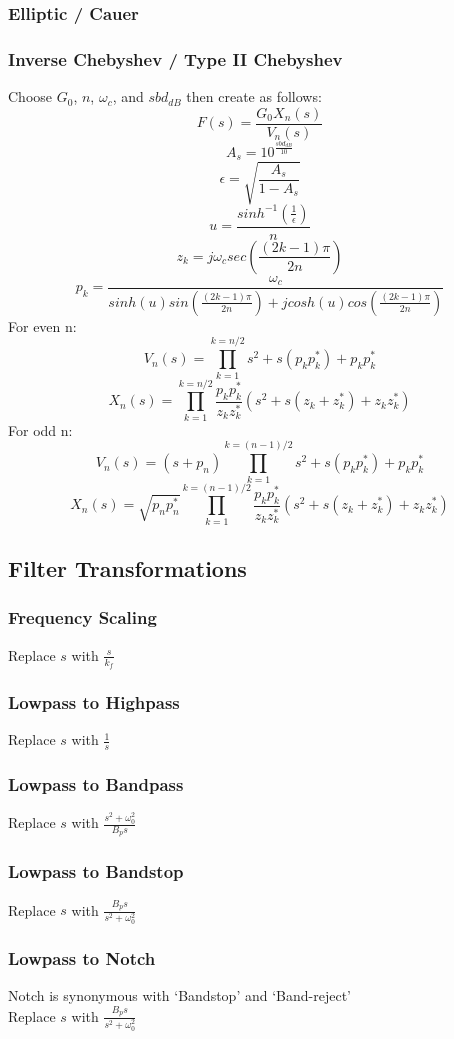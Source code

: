 \documentclass[11pt, oneside]{article}
\begin{document}
\subsubsection{Elliptic / Cauer}
\subsubsection{Inverse Chebyshev / Type II Chebyshev}
Choose $G_0$, $n$, $\omega_c$, and $sbd_{dB}$ then create as follows:\\
\[F(s) = \frac{G_0X_n(s)}{V_n(s)}\]
\[A_s = 10^{\frac{sbd_{dB}}{10}}\]
\[\epsilon = \sqrt{\frac{A_s}{1-A_s}}\]
\[u = \frac{sinh^{-1}(\frac{1}{\epsilon})}{n}\]
\[z_k = j\omega_c sec(\frac{(2k-1)\pi}{2n})\]
\[p_k = \frac{\omega_c}{sinh(u)sin(\frac{(2k-1)\pi}{2n})+jcosh(u)cos(\frac{(2k-1)\pi}{2n})}\]
For even n:
\[V_n(s) = \prod_{k=1}^{k=n/2}s^2+s(p_kp_k^*)+p_kp_k^*\]
\[X_n(s) = \prod_{k = 1}^{k = n/2}\frac{p_kp_k^*}{z_kz_k^*}(s^2+s(z_k+z_k^*)+z_kz_k^*)\]
For odd n:
\[V_n(s) = (s+p_n)\prod_{k=1}^{k=(n-1)/2}s^2+s(p_kp_k^*)+p_kp_k^*\]
\[X_n(s) =\sqrt{p_np_n^*} \prod_{k = 1}^{k = (n-1)/2}\frac{p_kp_k^*}{z_kz_k^*}(s^2+s(z_k+z_k^*)+z_kz_k^*)\]

\subsection{Filter Transformations}

\subsubsection{Frequency Scaling}
Replace $s$ with $\frac{s}{k_f}$

\subsubsection{Lowpass to Highpass}
Replace $s$ with $\frac{1}{s}$

\subsubsection{Lowpass to Bandpass}
Replace $s$ with $\frac{s^2+\omega_0^2}{B_ps}$

\subsubsection{Lowpass to Bandstop}
Replace $s$ with $\frac{B_ps}{s^2+\omega_0^2}$

\subsubsection{Lowpass to Notch}
Notch is synonymous with `Bandstop' and `Band-reject'\\
Replace $s$ with $\frac{B_ps}{s^2+\omega_0^2}$
\end{document}
